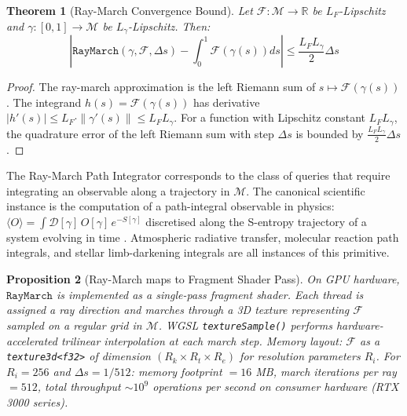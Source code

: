 \documentclass[10pt,twocolumn]{article}
\newtheorem{theorem}{Theorem}[section]
\newtheorem{proposition}[theorem]{Proposition}
\newcommand{\R}{\mathbb{R}}
\newcommand{\ManifoldM}{\mathcal{M}}
\begin{document}
\begin{theorem}[Ray-March Convergence Bound]
\label{thm:raymarch-bound}
Let $\mathcal{F} : \ManifoldM \to \R$ be $L_F$-Lipschitz and
$\gamma : [0,1] \to \ManifoldM$ be $L_\gamma$-Lipschitz.
Then:
\begin{equation}
\left| \mathtt{RayMarch}(\gamma, \mathcal{F}, \Delta s) - \int_0^1 \mathcal{F}(\gamma(s)) ds \right|
\leq \frac{L_F L_\gamma}{2} \Delta s
\label{eq:raymarch-error}
\end{equation}
\end{theorem}

\begin{proof}
The ray-march approximation is the left Riemann sum of $s \mapsto \mathcal{F}(\gamma(s))$.
The integrand $h(s) = \mathcal{F}(\gamma(s))$ has derivative
$|h'(s)| \leq L_F \cdot \|\gamma'(s)\| \leq L_F L_\gamma$.
For a function with Lipschitz constant $L_F L_\gamma$,
the quadrature error of the left Riemann sum with step $\Delta s$ is bounded by
$\frac{L_F L_\gamma}{2} \Delta s$ \cite{rudin1987}.
\end{proof}

The Ray-March Path Integrator corresponds to the class of queries
that require integrating an observable along a trajectory in $\ManifoldM$.
The canonical scientific instance is the computation of a path-integral
observable in physics: $\langle O \rangle = \int \mathcal{D}[\gamma] \, O[\gamma] \, e^{-S[\gamma]}$
discretised along the S-entropy trajectory of a system evolving in time \cite{feynman1948}.
Atmospheric radiative transfer, molecular reaction path integrals, and
stellar limb-darkening integrals are all instances of this primitive.

\begin{proposition}[Ray-March maps to Fragment Shader Pass]
\label{prop:raymarch-shader}
On GPU hardware, $\mathtt{RayMarch}$ is implemented as a single-pass
fragment shader. Each thread is assigned a ray direction and marches
through a 3D texture representing $\mathcal{F}$ sampled on a
regular grid in $\ManifoldM$. WGSL \texttt{textureSample()} performs
hardware-accelerated trilinear interpolation at each march step.
Memory layout: $\mathcal{F}$ as a \texttt{texture3d<f32>} of dimension
$(R_k \times R_t \times R_e)$ for resolution parameters $R_i$.
For $R_i = 256$ and $\Delta s = 1/512$: memory footprint $= 16$ MB,
march iterations per ray $= 512$, total throughput $\sim 10^9$ operations per second
on consumer hardware (RTX 3000 series).
\end{proposition}
\end{document}
